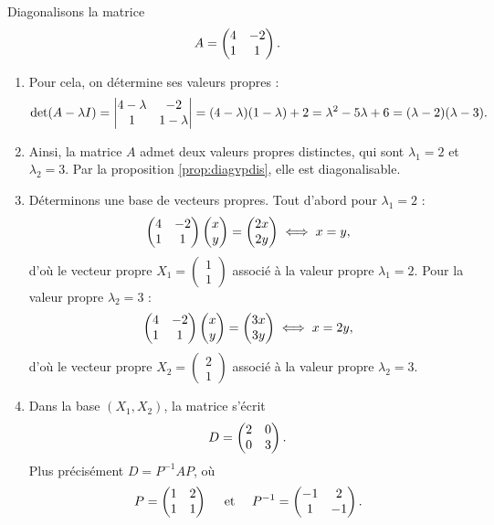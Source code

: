 \documentclass[11pt, class=report,crop=false]{standalone}
\begin{document}
\begin{exemple}
Diagonalisons la matrice 
$$A=\begin{pmatrix}4&-2\cr1&1\cr\end{pmatrix}.$$
\begin{enumerate}
  \item Pour cela, on détermine ses valeurs propres :
$$\det(A-\lambda I)=\begin{vmatrix}4-\lambda &-2\cr1&1-\lambda\end{vmatrix}=(4-\lambda)(1-\lambda)+2=\lambda^2-5\lambda+6=(\lambda-2)(\lambda-3).$$
  
  \item Ainsi, la matrice $A$ admet deux valeurs propres distinctes, qui sont $\lambda_1=2$ et $\lambda_2=3$. Par la proposition \ref{prop:diagvpdis}, elle est diagonalisable.
  
  \item Déterminons une base de vecteurs propres. Tout d'abord pour $\lambda_1 = 2$ :
$$\begin{pmatrix}4&-2\cr1&1\cr\end{pmatrix}\begin{pmatrix}x\cr y\end{pmatrix}=
\begin{pmatrix}2x\cr 2y\end{pmatrix}\iff x=y,$$
d'où le vecteur propre $X_1=\left(\begin{smallmatrix}1\\1\end{smallmatrix}\right)$ associé à la valeur propre $\lambda_1=2$. 
Pour la valeur propre $\lambda_2=3$ : 
$$\begin{pmatrix}4&-2\cr1&1\cr\end{pmatrix}\begin{pmatrix}x\cr y\end{pmatrix}=
\begin{pmatrix}3x\cr 3y\end{pmatrix}\iff x=2y,$$
d'où le vecteur propre $X_2=\left(\begin{smallmatrix}2\\1\end{smallmatrix}\right)$ associé à la valeur propre $\lambda_2=3$.
  
  \item Dans la base $(X_1, X_2)$, la matrice s'écrit
$$D=\left(\begin{matrix}2&0\cr0&3\cr\end{matrix}\right).$$
Plus précisément $D = P^{-1}AP$, où
$$P=\begin{pmatrix}1&2\cr1&1\cr\end{pmatrix}
\quad \text{ et } \quad 
P^{-1}=\begin{pmatrix}-1&2\cr1&-1\cr\end{pmatrix}.$$
  
\end{enumerate}
\end{exemple}
\end{document}
